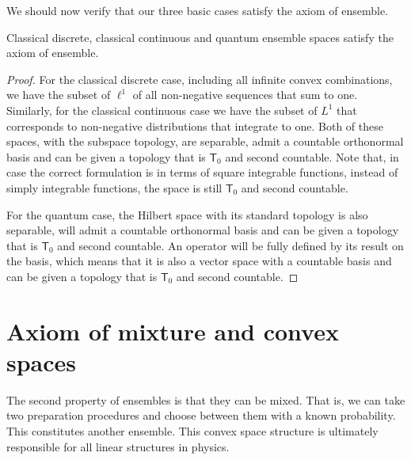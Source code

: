 We should now verify that our three basic cases satisfy the axiom of ensemble.

\begin{mathSection}
\begin{prop}
	Classical discrete, classical continuous and quantum ensemble spaces satisfy the axiom of ensemble.
\end{prop}

\begin{proof}
	For the classical discrete case, including all infinite convex combinations, we have the subset of $\ell^1$ of all non-negative sequences that sum to one. Similarly, for the classical continuous case we have the subset of $L^1$ that corresponds to non-negative distributions that integrate to one. Both of these spaces, with the subspace topology, are separable, admit a countable orthonormal basis and can be given a topology that is $\textsf{T}_0$ and second countable. Note that, in case the correct formulation is in terms of square integrable functions, instead of simply integrable functions, the space is still $\textsf{T}_0$ and second countable.
	
	For the quantum case, the Hilbert space with its standard topology is also separable, will admit a countable orthonormal basis and can be given a topology that is $\textsf{T}_0$ and second countable. An operator will be fully defined by its result on the basis, which means that it is also a vector space with a countable basis and can be given a topology that is $\textsf{T}_0$ and second countable.
\end{proof}
\end{mathSection}

\section{Axiom of mixture and convex spaces}

The second property of ensembles is that they can be mixed. That is, we can take two preparation procedures and choose between them with a known probability. This constitutes another ensemble. This convex space structure is ultimately responsible for all linear structures in physics.

